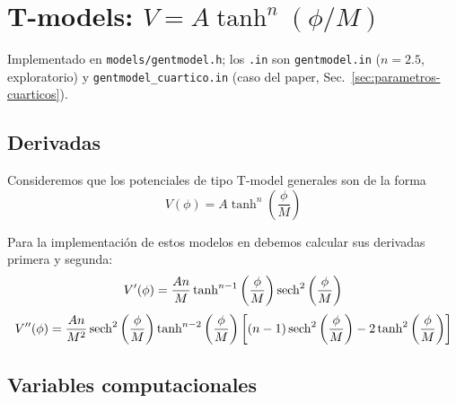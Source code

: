    \section{T-models: $V = A\tanh^n(\phi/M)$}
        \label{sec:tmodel}

        Implementado en \texttt{models/gentmodel.h}; los \texttt{.in} son \texttt{gentmodel.in} ($n = 2.5$, exploratorio) y \texttt{gentmodel\_cuartico.in} (caso del paper, Sec.~\ref{sec:parametros-cuarticos}).
            
        \subsection{Derivadas}

            Consideremos que los potenciales de tipo T-model generales son de la forma
            \begin{equation}
                V(\phi) = A \tanh^n \left( \frac{\phi}{M} \right)
            \end{equation}

            Para la implementación de estos modelos en \CosmoLattice debemos calcular sus derivadas primera y segunda:
            \begin{equation}
                V^\prime (\phi) = \frac{A n}{M} \tanh^{n - 1} \left( \frac{\phi}{M} \right) \sech^2 \left( \frac{\phi}{M} \right)
            \end{equation}
            \begin{equation}
                V^{\prime \prime} (\phi) = \frac{A n}{M^2} \sech^2 \left( \frac{\phi}{M} \right) \tanh^{n - 2} \left( \frac{\phi}{M} \right) \left[ (n - 1) \sech^2 \left( \frac{\phi}{M} \right) - 2 \tanh^2 \left( \frac{\phi}{M} \right) \right]
            \end{equation}

        \subsection{Variables computacionales}

